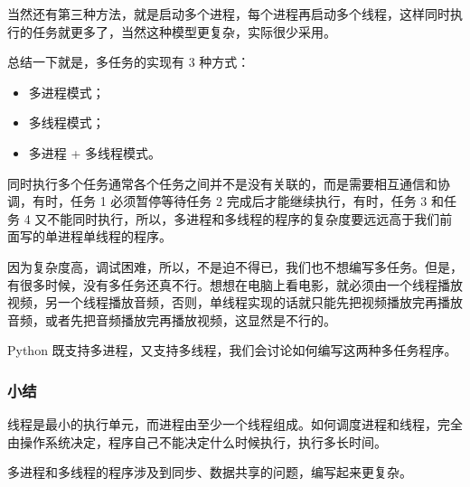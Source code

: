 当然还有第三种方法，就是启动多个进程，每个进程再启动多个线程，这样同时执行的任务就更多了，当然这种模型更复杂，实际很少采用。

总结一下就是，多任务的实现有 3 种方式：

\begin{itemize}
\item
  多进程模式；
\item
  多线程模式；
\item
  多进程 + 多线程模式。
\end{itemize}

同时执行多个任务通常各个任务之间并不是没有关联的，而是需要相互通信和协调，有时，任务
1 必须暂停等待任务 2 完成后才能继续执行，有时，任务 3 和任务 4
又不能同时执行，所以，多进程和多线程的程序的复杂度要远远高于我们前面写的单进程单线程的程序。

因为复杂度高，调试困难，所以，不是迫不得已，我们也不想编写多任务。但是，有很多时候，没有多任务还真不行。想想在电脑上看电影，就必须由一个线程播放视频，另一个线程播放音频，否则，单线程实现的话就只能先把视频播放完再播放音频，或者先把音频播放完再播放视频，这显然是不行的。

Python 既支持多进程，又支持多线程，我们会讨论如何编写这两种多任务程序。

\hypertarget{ux5c0fux7ed3}{%
\subsubsection{小结}\label{ux5c0fux7ed3}}

线程是最小的执行单元，而进程由至少一个线程组成。如何调度进程和线程，完全由操作系统决定，程序自己不能决定什么时候执行，执行多长时间。

多进程和多线程的程序涉及到同步、数据共享的问题，编写起来更复杂。

